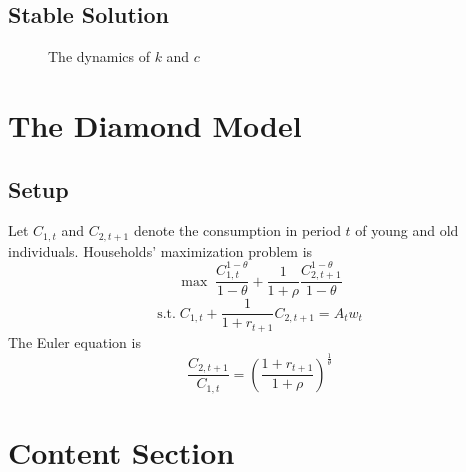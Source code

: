 \documentclass[12pt]{article} %
\begin{document}
\subsection{Stable Solution} 



\begin{figure}[H] %
	\caption{\small The dynamics of $k$ and $c$}
	\label{fig:speciation}
\end{figure}

\section{The Diamond Model}
\subsection{Setup} %
Let $C_{1,t}$ and $C_{2,t+1}$ denote the consumption in period $t$ of young and old individuals.
Households' maximization problem is 
\[
\max\; \frac{C_{1,t}^{1-\theta}}{1-\theta}+\frac{1}{1+\rho}\frac{C_{2,t+1}^{1-\theta}}{1-\theta}
\]
\[
\mathrm{s.t.}\;C_{1,t}+ \frac{1}{1+r_{t+1}}C_{2,t+1}=A_tw_t
\]
The Euler equation is 
\[
\frac{C_{2,t+1}}{C_{1,t}}=\left(\frac{1+r_{t+1}}{1+\rho}\right)^{\tfrac{1}{\theta}}
\]

\section{Content Section} %

\lipsum[5] %
\end{document}
